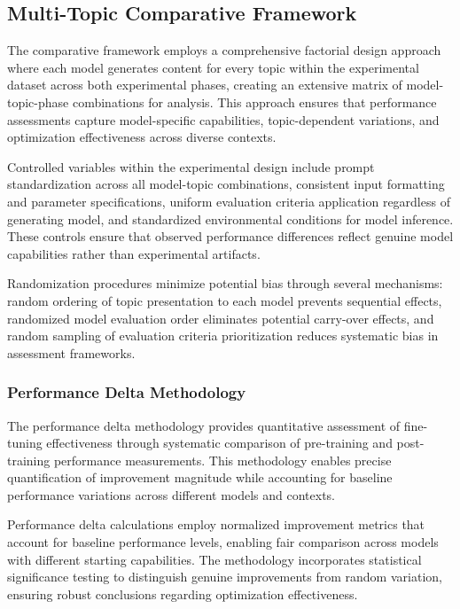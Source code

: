 \subsection{Multi-Topic Comparative Framework}

The comparative framework employs a comprehensive factorial design approach where each model generates content for every topic within the experimental dataset across both experimental phases, creating an extensive matrix of model-topic-phase combinations for analysis. This approach ensures that performance assessments capture model-specific capabilities, topic-dependent variations, and optimization effectiveness across diverse contexts.

Controlled variables within the experimental design include prompt standardization across all model-topic combinations, consistent input formatting and parameter specifications, uniform evaluation criteria application regardless of generating model, and standardized environmental conditions for model inference. These controls ensure that observed performance differences reflect genuine model capabilities rather than experimental artifacts.

Randomization procedures minimize potential bias through several mechanisms: random ordering of topic presentation to each model prevents sequential effects, randomized model evaluation order eliminates potential carry-over effects, and random sampling of evaluation criteria prioritization reduces systematic bias in assessment frameworks.

\subsubsection{Performance Delta Methodology}

The performance delta methodology provides quantitative assessment of fine-tuning effectiveness through systematic comparison of pre-training and post-training performance measurements. This methodology enables precise quantification of improvement magnitude while accounting for baseline performance variations across different models and contexts.

Performance delta calculations employ normalized improvement metrics that account for baseline performance levels, enabling fair comparison across models with different starting capabilities. The methodology incorporates statistical significance testing to distinguish genuine improvements from random variation, ensuring robust conclusions regarding optimization effectiveness.

